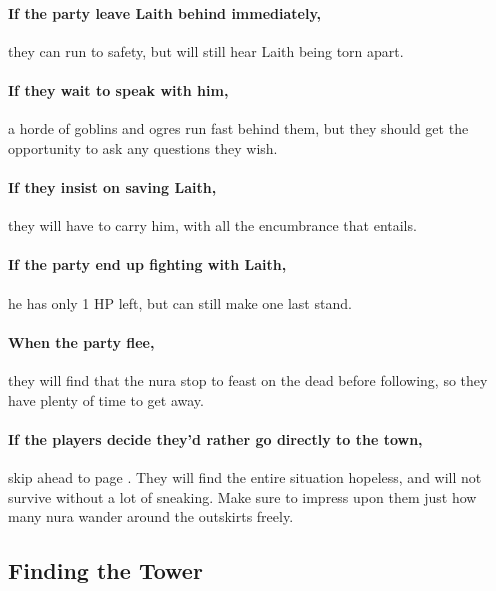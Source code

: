 \begin{multicols}{2}
\paragraph{If the party leave Laith behind immediately,}
they can run to safety, but will still hear Laith being torn apart.

\paragraph{If they wait to speak with him,}
a horde of goblins and ogres run fast behind them, but they should get the opportunity to ask any questions they wish.

\paragraph{If they insist on saving Laith,}
they will have to carry him, with all the encumbrance that entails.

\paragraph{If the party end up fighting with Laith,}
he has only 1 HP left, but can still make one last stand.

\paragraph{When the party flee,}
they will find that the nura stop to feast on the dead before following, so they have plenty of time to get away.

\paragraph{If the players decide they'd rather go directly to the town,}
skip ahead to page \pageref{siege}.
They will find the entire situation hopeless, and will not survive without a lot of sneaking.
Make sure to impress upon them just how many nura wander around the outskirts freely.


\deepogre

\goblin

\subsection{Finding the Tower}

\begin{boxtext}


\end{boxtext}
\end{multicols}
